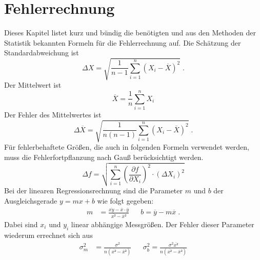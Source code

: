 \section{Fehlerrechnung}
Dieses Kapitel listet kurz und bündig die benötigten und aus den Methoden der Statistik bekannten Formeln für die Fehlerrechnung auf.
Die Schätzung der Standardabweichung ist
\begin{equation}
  \label{eq:std}
  \Delta X = \sqrt{\frac{1}{n-1}\sum_{i=1}^n(X_i-\overline{X})^2}     \; .
\end{equation}
Der Mittelwert ist
\begin{equation}
  \overline{X} = \frac{1}{n} \sum_{i=1}^nX_i
\end{equation}
Der Fehler des Mittelwertes ist
\begin{equation}
  \label{eq:std_mean}
  \Delta \overline{X} = \sqrt{\frac{1}{n(n-1)}\sum_{i=1}^n(X_i-\overline{X})^2}   \; .
\end{equation}
Für fehlerbehaftete Größen, die auch in folgenden Formeln verwendet werden, muss die Fehlerfortpflanzung nach Gauß berücksichtigt werden.
\begin{equation}
  \label{eq:GFFP}
  \Delta f = \sqrt{\sum_{i=1}^n \left(\frac{\partial f}{\partial X_i}\right)^2 \cdot (\Delta X_i)^2}
\end{equation}
Bei der linearen Regressionsrechnung sind die Parameter $m$ und $b$ der Ausgleichsgerade $y=mx+b$ wie folgt gegeben:
\begin{align}
  m &= \frac{\overline{xy}-\overline{x}\cdot\overline{y}}{\overline{x²} - \overline{x}²} & &  b = \overline{y} - m \overline{x}  \; .
\end{align}
Dabei sind $x_i$ und $y_i$ linear abhängige Messgrößen. Der Fehler dieser Parameter wiederum errechnet sich aus
\begin{align}
  \sigma_m^2 &= \frac{\sigma^2}{n(\overline{x²} - \overline{x}²)} & &\sigma_b^2 = \frac{\sigma^2\overline{x²}}{n(\overline{x²} - \overline{x}²)}
\end{align}
